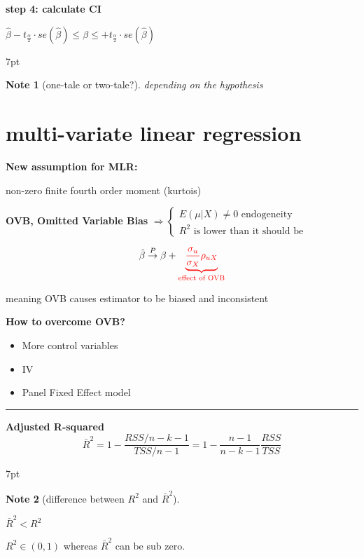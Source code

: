 \documentclass{article}
\providecommand{\tightlist}{
  \setlength{\itemsep}{0pt}
  \setlength{\parskip}{0pt}}
\newcommand*\sepline{%
  \begin{center}
    \rule[1ex]{.5\textwidth}{.5pt}
  \end{center}}
\newenvironment{blueblock}{
\def\FrameCommand{
  \hspace{1pt}
    {\color{DarkBlue}
    \vrule width 2pt}
    {\color{blueshade}
    \vrule width 4pt}
  \colorbox{blueshade}
}
\MakeFramed{
  \advance
  \hsize-
  \width
  \FrameRestore}
\noindent\hspace{-4.55pt}%
\begin{adjustwidth}{}{7pt}
\vspace{2pt}\vspace{2pt}
}
{\vspace{2pt}\end{adjustwidth}\endMakeFramed}
\newtheorem{note}{Note}
\begin{document}
\textbf{step 4: calculate CI}

$\hat{\beta}-t_{\frac{\alpha}{2}} \cdot se(\hat{\beta})\leqslant \beta \leqslant+t_{\frac{\alpha}{2}} \cdot se(\hat{\beta})$

\begin{blueblock}
\begin{note}[one-tale or two-tale?]
depending on the hypothesis
\end{note}
\end{blueblock}



\section{multi-variate linear regression} %
\label{sec:multi_variate_linear_regression}

\textbf{New assumption for MLR:}

non-zero finite fourth order moment (kurtois)


\textbf{OVB, Omitted Variable Bias }
$\Rightarrow 
\begin{cases}
  E(\mu|X)\neq 0 \text{ endogeneity}  
  \\
  R^2 \text{ is lower than it should be} 
\end{cases}$

\begin{equation}
  \hat{\beta}\stackrel{P}{\rightarrow}\beta+
  \color{red}
  \underbrace{\frac{\sigma_u}{\sigma_X}\rho_{uX}}_{\text{effect of OVB}}
\end{equation}

meaning OVB causes estimator to be biased and inconsistent

\textbf{How to overcome OVB?}
\begin{itemize}
\tightlist
  \item More control variables
  \item IV
  \item Panel Fixed Effect model
\end{itemize}

\sepline

\textbf{Adjusted R-squared}
\begin{equation}
  \bar R^2=1-\frac{RSS/n-k-1}{TSS/n-1}=1-\frac{n-1}{n-k-1}\frac{RSS}{TSS}
\end{equation}

\begin{blueblock}
\begin{note}[difference between $R^2$ and $\bar R^2$]
\end{note}
$\bar R^2<R^2$

$R^2 \in (0,1)$ whereas $\bar R^2 $ can be sub zero.
\end{blueblock}
\end{document}
